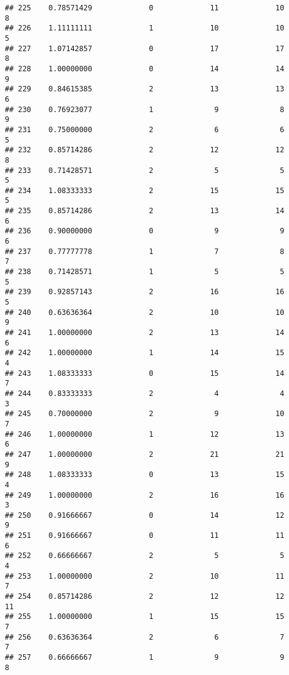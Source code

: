 \documentclass[
]{article}
\begin{document}
\begin{verbatim}
## 225    0.78571429             0             11             10              8
## 226    1.11111111             1             10             10              5
## 227    1.07142857             0             17             17              8
## 228    1.00000000             0             14             14              9
## 229    0.84615385             2             13             13              6
## 230    0.76923077             1              9              8              9
## 231    0.75000000             2              6              6              5
## 232    0.85714286             2             12             12              8
## 233    0.71428571             2              5              5              5
## 234    1.08333333             2             15             15              5
## 235    0.85714286             2             13             14              6
## 236    0.90000000             0              9              9              6
## 237    0.77777778             1              7              8              7
## 238    0.71428571             1              5              5              5
## 239    0.92857143             2             16             16              5
## 240    0.63636364             2             10             10              9
## 241    1.00000000             2             13             14              6
## 242    1.00000000             1             14             15              4
## 243    1.08333333             0             15             14              7
## 244    0.83333333             2              4              4              3
## 245    0.70000000             2              9             10              7
## 246    1.00000000             1             12             13              6
## 247    1.00000000             2             21             21              9
## 248    1.08333333             0             13             15              4
## 249    1.00000000             2             16             16              3
## 250    0.91666667             0             14             12              9
## 251    0.91666667             0             11             11              6
## 252    0.66666667             2              5              5              4
## 253    1.00000000             2             10             11              7
## 254    0.85714286             2             12             12             11
## 255    1.00000000             1             15             15              7
## 256    0.63636364             2              6              7              7
## 257    0.66666667             1              9              9              8

\end{verbatim}
\end{document}
